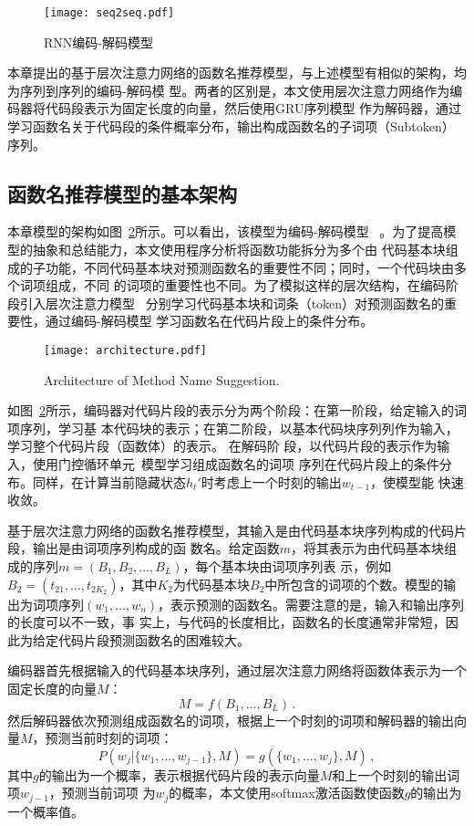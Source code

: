 \begin{figure} [!t]
	\centering
	\texttt{[image: seq2seq.pdf]}
	\caption{RNN编码-解码模型}
	\label{fig:seq2seq}
\end{figure}

本章提出的基于层次注意力网络的函数名推荐模型，与上述模型有相似的架构，均为序列到序列的编码-解码模
型。两者的区别是，本文使用层次注意力网络作为编码器将代码段表示为固定长度的向量，然后使用GRU序列模型
作为解码器，通过学习函数名关于代码段的条件概率分布，输出构成函数名的子词项（Subtoken）序列。

\subsection{函数名推荐模型的基本架构}
本章模型的架构如图~\ref{fig:arch}所示。可以看出，该模型为编码-解码模型
~\cite{Kyunghyun2014Learning}。为了提高模型的抽象和总结能力，本文使用程序分析将函数功能拆分为多个由
代码基本块组成的子功能，不同代码基本块对预测函数名的重要性不同；同时，一个代码块由多个词项组成，不同
的词项的重要性也不同。为了模拟这样的层次结构，在编码阶段引入层次注意力模型
~\cite{yang2016hierarchical}分别学习代码基本块和词条（token）对预测函数名的重要性，通过编码-解码模型
学习函数名在代码片段上的条件分布。

\begin{figure} [!t]
	\centering
	\texttt{[image: architecture.pdf]}
	\caption{Architecture of Method Name Suggestion.}
	\label{fig:arch}
\end{figure}

如图~\ref{fig:arch}所示，编码器对代码片段的表示分为两个阶段：在第一阶段，给定输入的词项序列，学习基
本代码块的表示；在第二阶段，以基本代码块序列列作为输入，学习整个代码片段（函数体）的表示。 在解码阶
段，以代码片段的表示作为输入，使用门控循环单元~\cite{Kyunghyun2014Learning}模型学习组成函数名的词项
序列在代码片段上的条件分布。同样，在计算当前隐藏状态$h_t'$时考虑上一个时刻的输出$w_{t-1}$，使模型能
快速收敛。

基于层次注意力网络的函数名推荐模型，其输入是由代码基本块序列构成的代码片段，输出是由词项序列构成的函
数名。给定函数$m$，将其表示为由代码基本块组成的序列$m=(B_1,B_2, \dots, B_L)$，每个基本块由词项序列表
示，例如$B_2 = (t_{21}, \dots, t_{2K_2})$，其中$K_2$为代码基本块$B_2$中所包含的词项的个数。模型的输
出为词项序列$(w_1, \dots, w_n)$，表示预测的函数名。需要注意的是，输入和输出序列的长度可以不一致，事
实上，与代码的长度相比，函数名的长度通常非常短，因此为给定代码片段预测函数名的困难较大。

编码器首先根据输入的代码基本块序列，通过层次注意力网络将函数体表示为一个固定长度的向量$M$：
\begin{equation}
M = f({B_1, \dots, B_L}) \,.
\label{eq:encoder}
\end{equation}
然后解码器依次预测组成函数名的词项，根据上一个时刻的词项和解码器的输出向量$M$，预测当前时刻的词项：
\begin{equation}
P(w_j|\{w_1, \dots, w_{j-1}\}, M) = g(\{w_1, \dots, w_{j}\}, M) \,,
\label{eq:decoder}
\end{equation}
其中$g$的输出为一个概率，表示根据代码片段的表示向量$M$和上一个时刻的输出词项$w_{j-1}$，预测当前词项
为$w_j$的概率，本文使用softmax激活函数使函数$g$的输出为一个概率值。

